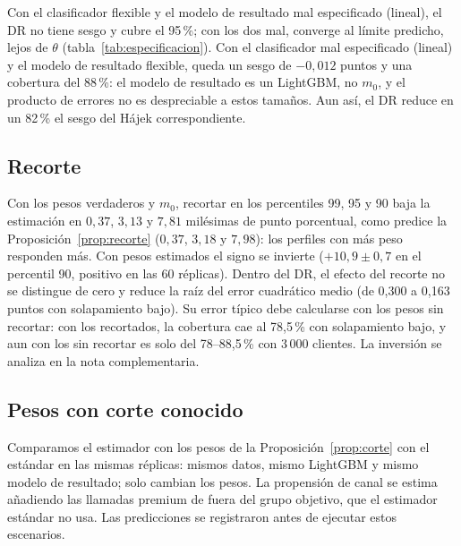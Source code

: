 Con el clasificador flexible y el modelo de resultado mal especificado (lineal), el DR no tiene sesgo y cubre el 95\,\%; con los dos mal, converge al límite predicho, lejos de $\theta$ (tabla~\ref{tab:especificacion}). Con el clasificador mal especificado (lineal) y el modelo de resultado flexible, queda un sesgo de $-0,012$ puntos y una cobertura del 88\,\%: el modelo de resultado es un LightGBM, no $m_0$, y el producto de errores no es despreciable a estos tamaños. Aun así, el DR reduce en un 82\,\% el sesgo del Hájek correspondiente.

\subsection{Recorte}\label{sec:res-recorte}

Con los pesos verdaderos y $m_0$, recortar en los percentiles 99, 95 y 90 baja la estimación en $0,37$, $3,13$ y $7,81$ milésimas de punto porcentual, como predice la Proposición~\ref{prop:recorte} ($0,37$, $3,18$ y $7,98$): los perfiles con más peso responden más. Con pesos estimados el signo se invierte ($+10,9\pm0,7$ en el percentil 90, positivo en las 60 réplicas). Dentro del DR, el efecto del recorte no se distingue de cero y reduce la raíz del error cuadrático medio (de 0,300 a 0,163 puntos con solapamiento bajo). Su error típico debe calcularse con los pesos sin recortar: con los recortados, la cobertura cae al 78,5\,\% con solapamiento bajo, y aun con los sin recortar es solo del 78--88,5\,\% con 3\,000 clientes. La inversión se analiza en la nota complementaria.

\subsection{Pesos con corte conocido}\label{sec:res-corte}

Comparamos el estimador con los pesos de la Proposición~\ref{prop:corte} con el estándar en las mismas réplicas: mismos datos, mismo LightGBM y mismo modelo de resultado; solo cambian los pesos. La propensión de canal se estima añadiendo las llamadas premium de fuera del grupo objetivo, que el estimador estándar no usa. Las predicciones se registraron antes de ejecutar estos escenarios.

